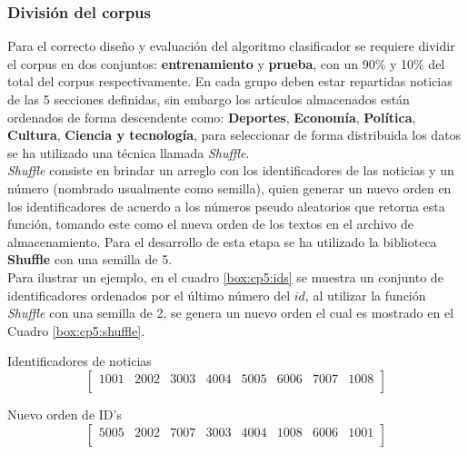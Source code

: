 \subsubsection{División del corpus}


Para el correcto diseño y evaluación del algoritmo clasificador se requiere dividir el corpus en dos conjuntos: \textbf{entrenamiento} y \textbf{prueba}, con un 90\% y 10\% del total del corpus respectivamente. En cada grupo deben estar repartidas noticias de las 5 secciones definidas, sin embargo los artículos almacenados están ordenados de forma descendente como: \textbf{Deportes}, \textbf{Economía}, \textbf{Política}, \textbf{Cultura}, \textbf{Ciencia y tecnología}, para seleccionar de forma distribuida los datos se ha utilizado una técnica llamada \textit{Shuffle}.\\

\textit{Shuffle} consiste en brindar un arreglo con los identificadores de las noticias y un número (nombrado usualmente como semilla), quien generar un nuevo orden en los identificadores de acuerdo a los números pseudo aleatorios que retorna esta función, tomando este como el nueva orden de los textos en el archivo de almacenamiento. Para el desarrollo de esta etapa se ha utilizado la biblioteca \textbf{Shuffle} con una semilla de 5.\\

Para ilustrar un ejemplo, en el cuadro \ref{box:cp5:ids} se muestra un conjunto de identificadores ordenados por el último número del $id$, al utilizar la función \textit{Shuffle} con una semilla de 2, se genera un nuevo orden el cual es mostrado en el Cuadro \ref{box:cp5:shuffle}.\\


\begin{mygraybox}[label={box:cp5:ids}]{Identificadores de noticias} 
\begin{equation*}
\begin{bmatrix}
1001 & 2002 & 3003 & 4004 & 5005 & 6006 & 7007 & 1008\\ 
\end{bmatrix}
\end{equation*}
\end{mygraybox}


\begin{mygraybox}[label={box:cp5:shuffle}]{Nuevo orden de ID's} 
\begin{equation*}
\begin{bmatrix}
5005 & 2002 & 7007 & 3003 & 4004 & 1008 & 6006 & 1001\\
\end{bmatrix}
\end{equation*}
\end{mygraybox}


